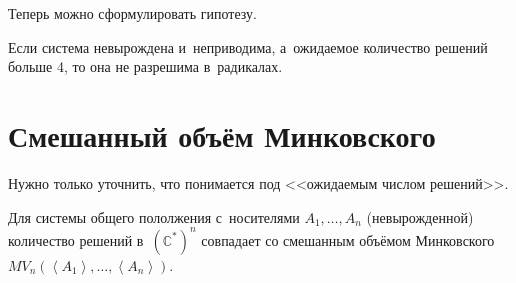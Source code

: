 \documentclass{article}
\begin{document}
Теперь можно сформулировать гипотезу.

\begin{claim}
	Если система невырождена и~неприводима, а~ожидаемое количество решений больше
	4, то она не разрешима в~радикалах.
\end{claim}

\section{Смешанный объём Минковского}

Нужно только уточнить, что понимается под <<ожидаемым числом решений>>.

\begin{theorem} Для системы общего пололжения
	с~носителями $A_1, \ldots, A_n$ (невырожденной) количество решений
	в~$(\mathbb{C}^\ast)^n$ совпадает со смешанным объёмом Минковского
	$MV_n(\left<A_1\right>, \ldots, \left<A_n\right>)$.
\end{theorem}
\end{document}
